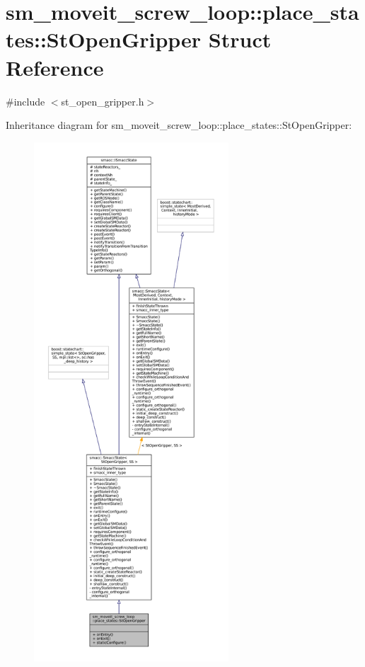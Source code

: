 \hypertarget{structsm__moveit__screw__loop_1_1place__states_1_1StOpenGripper}{}\section{sm\+\_\+moveit\+\_\+screw\+\_\+loop\+:\+:place\+\_\+states\+:\+:St\+Open\+Gripper Struct Reference}
\label{structsm__moveit__screw__loop_1_1place__states_1_1StOpenGripper}


{\ttfamily \#include $<$st\+\_\+open\+\_\+gripper.\+h$>$}



Inheritance diagram for sm\+\_\+moveit\+\_\+screw\+\_\+loop\+:\+:place\+\_\+states\+:\+:St\+Open\+Gripper\+:
\nopagebreak
\begin{figure}[H]
\begin{center}
\leavevmode
\includegraphics[height=550pt]{structsm__moveit__screw__loop_1_1place__states_1_1StOpenGripper__inherit__graph}
\end{center}
\end{figure}


